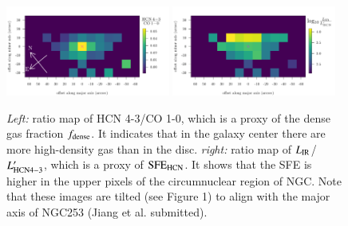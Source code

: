 \documentclass[legal,11pt]{article}
\def\kms    {\ifmmode{{\rm \ts km\ts s}^{-1}}\else{\ts km\ts s$^{-1}$}\fi}
\def\kms    {km\,s$^{-1}$\,}
\def\,{\thinspace}
\def\LIR     {$L_{\rm IR}$}
\def\HCNtt        {HCN\,$J$=3$\rightarrow$2}
\begin{document}
\begin{figure}
\centering

\includegraphics[width=0.48\textwidth]{Jiang_hcn_to_co10.pdf}
\includegraphics[width=0.48\textwidth]{Jiang_Lir_Lhcn.pdf}
\caption{
{\it Left:} ratio map of HCN 4-3/CO 1-0, which is a proxy of the dense gas fraction $f_{\rm dense}$. It indicates that in the galaxy center there are more high-density gas than in the disc.
{\it right:} ratio map of \LIR/$L'_{\rm HCN 4-3}$, which is a proxy of ${\rm SFE_{HCN}}$. It shows that the SFE is higher in the upper pixels of the circumnuclear region of NGC\,253.
Note that these images are tilted (see Figure 1) to align with the major axis of NGC253 (Jiang et al. submitted).
}
\label{fig:spe-hcn32}
\end{figure}

\end{document}
